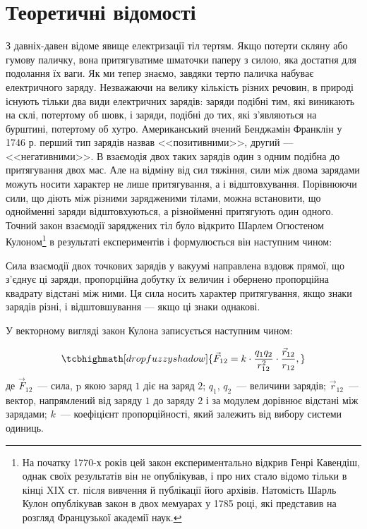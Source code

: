 
\section{Теоретичні відомості}

З давніх-давен відоме явище електризації тіл тертям. Якщо потерти скляну або гумову паличку, вона притягуватиме шматочки паперу з силою, яка достатня для подолання їх ваги. Як ми тепер знаємо, завдяки тертю паличка набуває електричного заряду. Незважаючи на велику кількість різних речовин, в природі існують тільки два види електричних зарядів: заряди подібні тим, які виникають на склі, потертому об шовк, і заряди, подібні до тих, які з'являються на бурштині, потертому об хутро. Американський вчений Бенджамін Франклін у 1746 р. перший тип зарядів назвав <<позитивними>>, другий --- <<негативними>>.  В взаємодія двох таких зарядів один з одним подібна до притягування двох мас. Але на відміну від сил тяжіння, сили між двома зарядами можуть носити характер не лише притягування, а і відштовхування. Порівнюючи сили, що діють між різними зарядженими тілами, можна встановити, що однойменні заряди відштовхуються, а різнойменні притягують один одного. Точний закон взаємодії заряджених тіл було відкрито Шарлем Огюстеном Кулоном\footnote{На початку 1770-х років цей закон експериментально відкрив Генрі Кавендіш, однак своїх результатів він не опублікував, і про них стало відомо тільки в кінці XIX ст. після вивчення й публікації його архівів. Натомість Шарль Кулон опублікував закон в двох мемуарах у 1785 році,  які представив на розгляд Французької академії наук.} в результаті експериментів і формулюється він наступним чином:

\begin{Definition}
Сила взаємодії двох точкових зарядів у вакуумі направлена вздовж прямої, що з'єднує ці заряди, пропорційна добутку їх величин і обернено пропорційна квадрату відстані між ними. Ця сила носить характер притягування, якщо знаки зарядів різні, і відштовшування --- якщо ці знаки однакові.
\end{Definition}

У векторному вигляді закон Кулона записується наступним чином:

\begin{equation}\label{key}
    \tcbhighmath[drop fuzzy shadow]{
    \vec{F}_{12}=k\cdot\frac{q_1  q_2}{r_{12}^2} \cdot \frac{\vec{r}_{12}}{r_{12}},
    }
\end{equation}
де $\vec{F}_{12}$ --- сила, p якою заряд $1$ діє на заряд $2$; $q_1$, $q_2$ --- величини зарядів; $\vec{r}_{12}$ --- вектор, напрямлений від заряду $1$ до заряду  $2$ і за модулем дорівнює відстані між зарядами; $k$ --- коефіцієнт пропорційності, який залежить від вибору системи одиниць.

